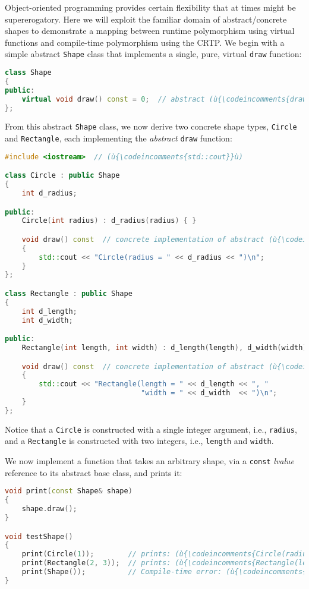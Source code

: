 Object-oriented programming provides certain flexibility that at times
might be supererogatory. Here we will exploit the familiar domain of
abstract/concrete shapes to demonstrate a mapping between runtime
polymorphism using virtual functions and compile-time polymorphism using
the CRTP. We begin with a simple abstract \texttt{Shape} class that
implements a single, pure, virtual \texttt{draw} function:

\begin{lstlisting}[language=C++]
class Shape
{
public:
    virtual void draw() const = 0;  // abstract (ù{\codeincomments{draw}}ù) function (interface)
};
\end{lstlisting}
    
\noindent From this abstract \texttt{Shape} class, we now derive two concrete
shape types, \texttt{Circle} and \mbox{\texttt{Rectangle}}, each implementing
the \emph{abstract} \texttt{draw} function:

\begin{lstlisting}[language=C++]
#include <iostream>  // (ù{\codeincomments{std::cout}}ù)

class Circle : public Shape
{
    int d_radius;

public:
    Circle(int radius) : d_radius(radius) { }

    void draw() const  // concrete implementation of abstract (ù{\codeincomments{draw}}ù) function
    {
        std::cout << "Circle(radius = " << d_radius << ")\n";
    }
};

class Rectangle : public Shape
{
    int d_length;
    int d_width;

public:
    Rectangle(int length, int width) : d_length(length), d_width(width) { }

    void draw() const  // concrete implementation of abstract (ù{\codeincomments{draw}}ù) function
    {
        std::cout << "Rectangle(length = " << d_length << ", "
                                "width = " << d_width  << ")\n";
    }
};
\end{lstlisting}
    
\noindent Notice that a \texttt{Circle} is constructed with a single integer
argument, i.e., \texttt{radius}, and a \texttt{Rectangle} is constructed
with two integers, i.e., \texttt{length} and \texttt{width}.

We now implement a function that takes an arbitrary shape, via a
\texttt{const} \emph{lvalue} reference to its abstract base class, and
prints it:

\begin{lstlisting}[language=C++]
void print(const Shape& shape)
{
    shape.draw();
}

void testShape()
{
    print(Circle(1));        // prints: (ù{\codeincomments{Circle(radius = 1)}}ù)
    print(Rectangle(2, 3));  // prints: (ù{\codeincomments{Rectangle(length = 2, width = 3)}}ù)
    print(Shape());          // Compile-time error: (ù{\codeincomments{Shape}}ù) is an abstract class.
}
\end{lstlisting}
    
